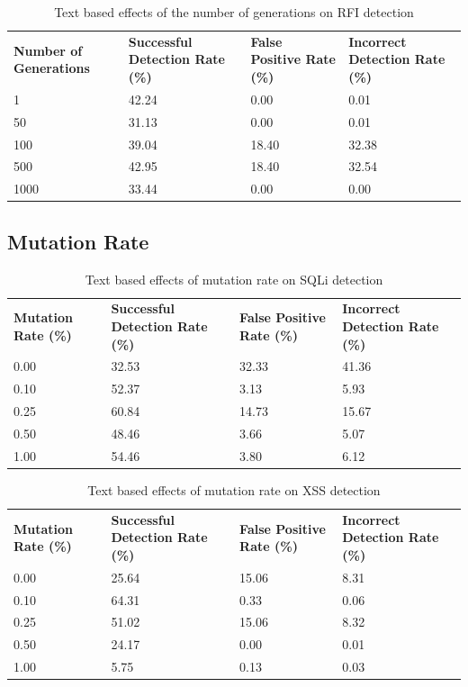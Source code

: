 \begin{appendices}
\begin{table}[h]
	\centering
	\begin{tabular}{|p{1.5in}|p{1in}|p{1in}|p{1in}|}
	\hline
	\textbf{Number of Generations} & \textbf{Successful Detection Rate (\%)} & \textbf{False Positive Rate (\%)} & \textbf{Incorrect Detection Rate (\%)}  \\
	\hhline{|=|=|=|=|}
	1 & 42.24 & 0.00 & 0.01 \\
	\hline
	50 & 31.13 & 0.00 & 0.01 \\
	\hline
	100 & 39.04 & 18.40 & 32.38 \\
	\hline
	500 & 42.95 & 18.40 & 32.54 \\
	\hline
	1000 & 33.44 & 0.00 & 0.00 \\
	\hline
	\end{tabular}
	\caption{Text based effects of the number of generations on RFI detection}
\end{table}

\newpage
\subsection{Mutation Rate}

\begin{table}[h]
	\centering
	\begin{tabular}{|p{1.5in}|p{1in}|p{1in}|p{1in}|}
	\hline
	\textbf{Mutation Rate (\%)} & \textbf{Successful Detection Rate (\%)} & \textbf{False Positive Rate (\%)} & \textbf{Incorrect Detection Rate (\%)}  \\
	\hhline{|=|=|=|=|}
	0.00 & 32.53 & 32.33 & 41.36 \\
	\hline
	0.10 & 52.37 & 3.13 & 5.93 \\
	\hline
	0.25 & 60.84 & 14.73 & 15.67 \\
	\hline
	0.50 & 48.46 & 3.66 & 5.07 \\
	\hline
	1.00 & 54.46 & 3.80 & 6.12 \\
	\hline
	\end{tabular}
	\caption{Text based effects of mutation rate on SQLi detection}
\end{table}

\begin{table}[h]
	\centering
	\begin{tabular}{|p{1.5in}|p{1in}|p{1in}|p{1in}|}
	\hline
	\textbf{Mutation Rate (\%)} & \textbf{Successful Detection Rate (\%)} & \textbf{False Positive Rate (\%)} & \textbf{Incorrect Detection Rate (\%)}  \\
	\hhline{|=|=|=|=|}
	0.00 & 25.64 & 15.06 & 8.31 \\
	\hline
	0.10 & 64.31 & 0.33 & 0.06 \\
	\hline
	0.25 & 51.02 & 15.06 & 8.32 \\
	\hline
	0.50 & 24.17 & 0.00 & 0.01 \\
	\hline
	1.00 & 5.75 & 0.13 & 0.03 \\
	\hline
	\end{tabular}
	\caption{Text based effects of mutation rate on XSS detection}
\end{table}


\end{appendices}
